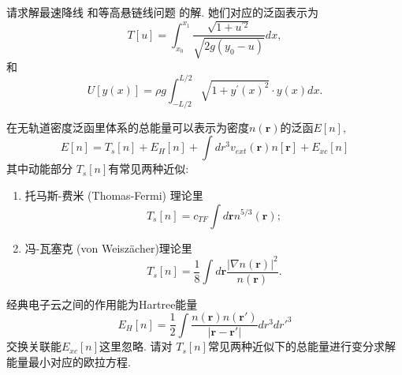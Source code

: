 \documentclass[10pt]{article}
\newenvironment{problem}[2][]{\begin{trivlist}
\item[\hskip \labelsep {\bfseries #1}\hskip \labelsep {\bfseries #2}]}{\end{trivlist}}
\begin{document}
\begin{problem}{5.6}
请求解最速降线
和等高悬链线问题
的解.
她们对应的泛函表示为
$$
T[u] = \int_{x_0}^{x_1} \frac{\sqrt{1+u^{\prime 2}}}{\sqrt{2 g\left(y_0-u\right)}} d x, 
$$
和
$$
U[y(x)]= \rho g  \int_{-L / 2}^{L / 2} \sqrt{1+y^{\prime}(x)^2} \cdot y(x) d x. 
$$
\end{problem}



\begin{problem}{5.7}
在无轨道密度泛函里体系的总能量可以表示为密度$n(\mathbf{r})$的泛函$E[n]$,
$$
E[n] = T_s[n] + E_H[n] + \int dr^3 v_{ext}(\mathbf{r}) n[\mathbf{r}] + E_{xc}[n]
$$
其中动能部分 $T_s[n]$有常见两种近似:
\begin{enumerate}
  \item 托马斯-费米 (Thomas-Fermi) 理论里
  $$
  T_s[n] = c_{T F} \int d \mathbf{r} n^{5 / 3}(\mathbf{r});
  $$ 
  \item 冯-瓦塞克 (von Weisz\"acher)理论里
  $$
  T_s[n] =  \frac{1}{8} \int d \mathbf{r} \frac{|\nabla n(\mathbf{r})|^2}{n(\mathbf{r})}.
  $$
\end{enumerate}
经典电子云之间的作用能为Hartree能量
$$
E_H[n] = 
 \frac{1}{2} 
 \int \frac{n(\mathbf{r}) n(\mathbf{r}')}{|\mathbf{r} - \mathbf{r}'|}
 dr^3 dr'^3
$$
交换关联能$ E_{xc}[n]$这里忽略. 请对 $T_s[n]$常见两种近似下的总能量进行变分求解能量最小对应的欧拉方程.
\end{problem}
  
\end{document}
